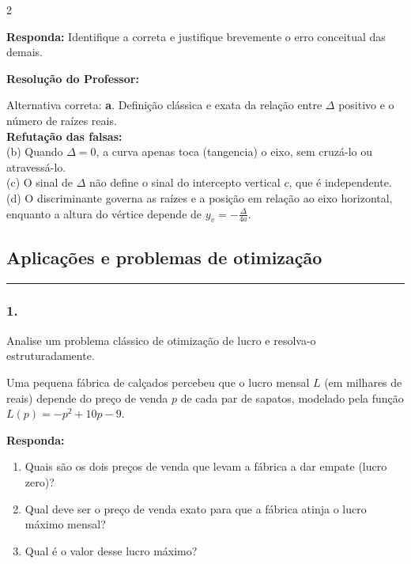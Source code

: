 \begin{multicols*}{2}
\begin{boxresponda}
\textbf{Responda:} Identifique a correta e justifique brevemente o erro conceitual das demais.
\end{boxresponda}

\ifgabarito
    \begin{tcolorbox}[colback=CorTitUm!5, colframe=CorTitUm, boxrule=1pt, arc=4pt, left=6pt, right=6pt, top=6pt, bottom=6pt]
    \small\textbf{\textcolor{CorTitUm}{Resolução do Professor:}}\par\vspace{0.1cm}
    \color{CinzaEscuro}
    Alternativa correta: \textbf{a}. Definição clássica e exata da relação entre $\Delta$ positivo e o número de raízes reais. \\
    \textbf{Refutação das falsas:} \\
    (b) Quando $\Delta = 0$, a curva apenas toca (tangencia) o eixo, sem cruzá-lo ou atravessá-lo. \\
    (c) O sinal de $\Delta$ não define o sinal do intercepto vertical $c$, que é independente. \\
    (d) O discriminante governa as raízes e a posição em relação ao eixo horizontal, enquanto a altura do vértice depende de $y_v = -\frac{\Delta}{4a}$.
    \end{tcolorbox}
\fi
\subsection*{Aplicações e problemas de otimização}
\vspace{-0.2cm}\noindent\rule{\linewidth}{1.5pt} 
\par\vspace{\espacoPosTitulo}
\subsubsection*{1.} Analise um problema clássico de otimização de lucro e resolva-o estruturadamente.

Uma pequena fábrica de calçados percebeu que o lucro mensal $L$ (em milhares de reais) depende do preço de venda $p$ de cada par de sapatos, modelado pela função $L(p) = -p^2 + 10p - 9$.
\begin{boxresponda}
\textbf{Responda:} 
\begin{enumerate}[label=\alph*), itemsep=\espacoAlt]
\item Quais são os dois preços de venda que levam a fábrica a dar empate (lucro zero)?
\item Qual deve ser o preço de venda exato para que a fábrica atinja o lucro máximo mensal?
\item Qual é o valor desse lucro máximo?
\end{enumerate}
\end{boxresponda}


\end{multicols*}
